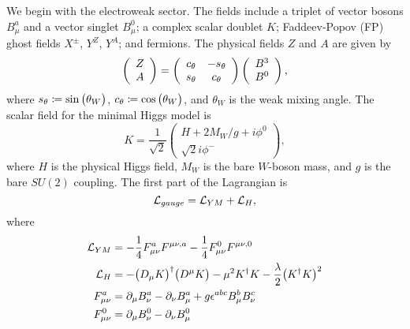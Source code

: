We begin with the electroweak sector. The fields include a triplet of vector
bosons $B_{\mu}^{a}$ and a vector singlet $B_{\mu}^{0}$; a complex scalar
doublet $K$; Faddeev-Popov (FP) ghost fields $X^{\pm}$, $Y^Z$, $Y^A$; and
fermions. The physical fields $Z$ and $A$ are given by
\begin{equation}
  \left(\begin{array}{c}
    Z \\
    A
  \end{array}\right)
  =
  \left(\begin{array}{cc}
    c_{\theta} & -s_{\theta} \\
    s_{\theta} & c_{\theta}
  \end{array}\right)
  \left(\begin{array}{c}
    B^3 \\
    B^0
  \end{array}\right),
\end{equation}
where $s_{\theta}\coloneqq\sin\big(\theta_{W}\big)$,
$c_{\theta}\coloneqq\cos\big(\theta_{W}\big)$, and $\theta_W$ is the weak
mixing angle. The scalar field for the minimal Higgs model is
\begin{equation}
  \label{eq:Hsf}
  K=\frac{1}{\sqrt{2}}
  \left(\begin{array}{c}
    H+2M_{W}/g+i\phi^0 \\
    \sqrt{2}i\phi^-
  \end{array}\right),
\end{equation}
where $H$ is the physical Higgs field, $M_W$ is the bare $W$-boson mass, and
$g$ is the bare $SU(2)$ coupling. The first part of the Lagrangian is
\begin{equation}
  \mathcal{L}_{gauge}=\mathcal{L}_{YM}+\mathcal{L}_{H},
\end{equation}
where
\begin{equation}
  \begin{aligned}
    \mathcal{L}_{YM}&=-\frac{1}{4}F_{\mu\nu}^{a}F^{\mu\nu,a}
                -\frac{1}{4}F_{\mu\nu}^{0}F^{\mu\nu,0} \\
    \mathcal{L}_{H}&=-\big(D_{\mu}K\big)^{\dagger}\big(D^{\mu}K\big)
               -\mu^2 K^{\dagger}K 
               -\frac{\lambda}{2}\big(K^{\dagger}K\big)^2 \\
    F_{\mu\nu}^{a}&=\partial_{\mu}B_{\nu}^{a}-\partial_{\nu}B_{\mu}^{a}
                   +g\epsilon^{abc}B_{\mu}^{b}B_{\nu}^{c} \\
    F_{\mu\nu}^{0}&=\partial_{\mu}B_{\nu}^{0}-\partial_{\nu}B_{\mu}^{0}
  \end{aligned}
\end{equation}
